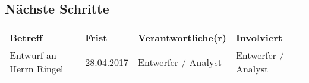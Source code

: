 \documentclass{scrartcl}
\begin{document}
\subsection{Nächste Schritte}
\begin{tabular}{L{.249} L{.2} L{.25} L{.25}}
Betreff & Frist & Verantwortliche(r) & Involviert\\\hline
Entwurf an Herrn Ringel & 28.04.2017 & Entwerfer / Analyst & Entwerfer / Analyst\\
\end{tabular}
\end{document}
